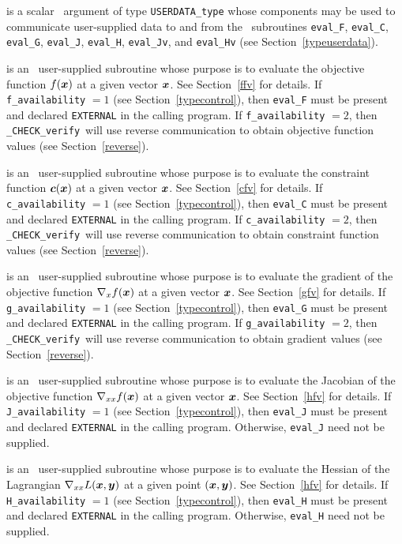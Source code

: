 \documentclass{galahad}
\newcommand{\packagename}{CHECK}
\newcommand{\fullpackagename}{\libraryname\_\packagename}
\newcommand{\solver}{{\tt \fullpackagename\_verify}}
\begin{document}
\begin{description}
 is a scalar \intentinout\ argument of type 
{\tt USERDATA\_type} whose components may be used
to communicate user-supplied data to and from the
\optional\ subroutines
{\tt eval\_F}, {\tt eval\_C}, {\tt eval\_G}, {\tt eval\_J},
{\tt eval\_H}, {\tt eval\_Jv}, and {\tt eval\_Hv}
(see Section~\ref{typeuserdata}). 

 is an \optional\ 
user-supplied subroutine whose purpose is to evaluate the 
objective function $f({\bm{x}})$ at a given vector ${\bm{x}}$.
See Section~\ref{ffv} for details.
If {\tt f\_availability} $=1$ (see Section~\ref{typecontrol}), then {\tt eval\_F}
must be present and declared {\tt EXTERNAL} in the calling program.
If {\tt f\_availability} $=2$, then \solver\ will use reverse communication to
obtain objective function values (see Section~\ref{reverse}).

 is an \optional\ 
user-supplied subroutine whose purpose is to evaluate the 
constraint function ${\bm{c}}({\bm{x}})$ at a given vector ${\bm{x}}$.
See Section~\ref{cfv} for details.
If {\tt c\_availability} $=1$ (see Section~\ref{typecontrol}), then {\tt eval\_C} must be present 
and declared {\tt EXTERNAL} in the calling program.
If {\tt c\_availability} $=2$, then \solver\ will use reverse communication to
obtain constraint function values (see Section~\ref{reverse}).

 is an \optional\ 
user-supplied subroutine whose purpose is to evaluate the  
gradient of the objective function $\nabla_x f({\bm{x}})$ at a given vector ${\bm{x}}$.
See Section~\ref{gfv} for details.
If {\tt g\_availability} $=1$ (see Section~\ref{typecontrol}), then {\tt eval\_G} must be present 
and declared {\tt EXTERNAL} in the calling program.
If {\tt g\_availability} $=2$, then \solver\ will use reverse communication to
obtain gradient values (see Section~\ref{reverse}).

\itt{eval\_J} is an \optional\ 
user-supplied subroutine whose purpose is to evaluate the 
Jacobian of the objective function $\nabla_{xx} f({\bm{x}})$ at a given vector ${\bm{x}}$.
See Section~\ref{hfv} for details.
If {\tt J\_availability} $=1$ (see Section~\ref{typecontrol}), then {\tt eval\_J} must be present and  
declared {\tt EXTERNAL} in the calling program.  Otherwise, {\tt eval\_J} need not be supplied.

\itt{eval\_H} is an \optional\ 
user-supplied subroutine whose purpose is to evaluate the
Hessian of the Lagrangian $\nabla_{xx} L({\bm{x}},{\bm{y}})$ at a given point $({\bm{x}},{\bm{y}})$.
See Section~\ref{hfv} for details.
If {\tt H\_availability} $=1$ (see Section~\ref{typecontrol}), then
{\tt eval\_H} must be present and  
declared {\tt EXTERNAL} in the calling program.  Otherwise, {\tt eval\_H} need not be supplied.


\end{description}
\end{document}
